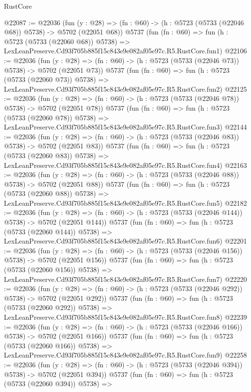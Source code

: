 \begin{lexlean}{RustCore}
\begin{coremodule}
@22087 := @22036
    (fun (y : @28) => (fn : @60) -> (h : @5723 (@5733 (@22046 @68)) @5738) -> @5702 (@22051 @68))
    @5737
    (fun (fn : @60) =>
    fun (h : @5723 (@5733 (@22060 @68)) @5738) =>
    LexLeanPreserve.Cd93f705b885f15c843e9e082af05e97c.R5.RustCore.fun1)
@22106 := @22036
    (fun (y : @28) => (fn : @60) -> (h : @5723 (@5733 (@22046 @73)) @5738) -> @5702 (@22051 @73))
    @5737
    (fun (fn : @60) =>
    fun (h : @5723 (@5733 (@22060 @73)) @5738) =>
    LexLeanPreserve.Cd93f705b885f15c843e9e082af05e97c.R5.RustCore.fun2)
@22125 := @22036
    (fun (y : @28) => (fn : @60) -> (h : @5723 (@5733 (@22046 @78)) @5738) -> @5702 (@22051 @78))
    @5737
    (fun (fn : @60) =>
    fun (h : @5723 (@5733 (@22060 @78)) @5738) =>
    LexLeanPreserve.Cd93f705b885f15c843e9e082af05e97c.R5.RustCore.fun3)
@22144 := @22036
    (fun (y : @28) => (fn : @60) -> (h : @5723 (@5733 (@22046 @83)) @5738) -> @5702 (@22051 @83))
    @5737
    (fun (fn : @60) =>
    fun (h : @5723 (@5733 (@22060 @83)) @5738) =>
    LexLeanPreserve.Cd93f705b885f15c843e9e082af05e97c.R5.RustCore.fun4)
@22163 := @22036
    (fun (y : @28) => (fn : @60) -> (h : @5723 (@5733 (@22046 @88)) @5738) -> @5702 (@22051 @88))
    @5737
    (fun (fn : @60) =>
    fun (h : @5723 (@5733 (@22060 @88)) @5738) =>
    LexLeanPreserve.Cd93f705b885f15c843e9e082af05e97c.R5.RustCore.fun5)
@22182 := @22036
    (fun (y : @28) => (fn : @60) -> (h : @5723 (@5733 (@22046 @144)) @5738) -> @5702 (@22051 @144))
    @5737
    (fun (fn : @60) =>
    fun (h : @5723 (@5733 (@22060 @144)) @5738) =>
    LexLeanPreserve.Cd93f705b885f15c843e9e082af05e97c.R5.RustCore.fun6)
@22201 := @22036
    (fun (y : @28) => (fn : @60) -> (h : @5723 (@5733 (@22046 @156)) @5738) -> @5702 (@22051 @156))
    @5737
    (fun (fn : @60) =>
    fun (h : @5723 (@5733 (@22060 @156)) @5738) =>
    LexLeanPreserve.Cd93f705b885f15c843e9e082af05e97c.R5.RustCore.fun7)
@22220 := @22036
    (fun (y : @28) => (fn : @60) -> (h : @5723 (@5733 (@22046 @292)) @5738) -> @5702 (@22051 @292))
    @5737
    (fun (fn : @60) =>
    fun (h : @5723 (@5733 (@22060 @292)) @5738) =>
    LexLeanPreserve.Cd93f705b885f15c843e9e082af05e97c.R5.RustCore.fun8)
@22239 := @22036
    (fun (y : @28) => (fn : @60) -> (h : @5723 (@5733 (@22046 @166)) @5738) -> @5702 (@22051 @166))
    @5737
    (fun (fn : @60) =>
    fun (h : @5723 (@5733 (@22060 @166)) @5738) =>
    LexLeanPreserve.Cd93f705b885f15c843e9e082af05e97c.R5.RustCore.fun9)
@22258 := @22036
    (fun (y : @28) => (fn : @60) -> (h : @5723 (@5733 (@22046 @394)) @5738) -> @5702 (@22051 @394))
    @5737
    (fun (fn : @60) =>
    fun (h : @5723 (@5733 (@22060 @394)) @5738) =>

\end{coremodule}
\end{lexlean}
